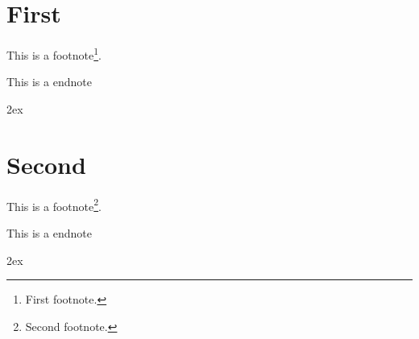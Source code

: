 \documentclass{article}
\begin{document}
\section{First}

This is a footnote\footnote{First footnote.}.

This is a endnote

\begingroup
\parindent 0pt
\parskip 2ex
\def\enotesize{\normalsize}
\printendnotes
\endgroup

\section{Second}

This is a footnote\footnote{Second footnote.}.

This is a endnote

\begingroup
\parindent 0pt
\parskip 2ex
\def\enotesize{\normalsize}
\printendnotes
\endgroup
\end{document}
